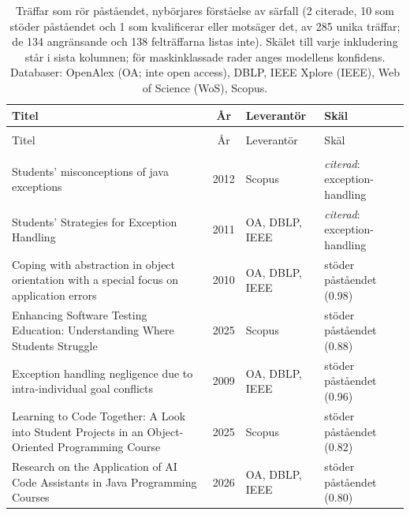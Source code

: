 
\begingroup\footnotesize
\begin{longtable}{@{}%
  >{\raggedright\arraybackslash}p{}c%
  >{\raggedright\arraybackslash}p{}%
  >{\raggedright\arraybackslash}p{}@{}}
\caption{Träffar som rör påståendet, nybörjares förståelse av särfall (2 citerade, 10 som stöder påståendet och 1 som kvalificerar eller motsäger det, av 285 unika träffar; de 134 angränsande och 138 felträffarna listas inte). Skälet till varje inkludering står i sista kolumnen; för maskinklassade rader anges modellens konfidens. Databaser: OpenAlex (OA; inte open access), DBLP, IEEE Xplore (IEEE), Web of Science (WoS), Scopus.}\label{tab:sok-nyborjare}\\
\toprule
Titel & År & Leverantör & Skäl \\
\midrule
\endfirsthead
\multicolumn{4}{@{}l}{\emph{\tablename~\thetable{} (forts.)}}\\
\toprule
Titel & År & Leverantör & Skäl \\
\midrule
\endhead
\midrule \multicolumn{4}{r@{}}{\emph{forts.\ på nästa sida}}\\
\endfoot
\bottomrule
\endlastfoot
Students' misconceptions of java exceptions & 2012 & Scopus & \emph{citerad}: exception-handling \\
Students' Strategies for Exception Handling & 2011 & OA, DBLP, IEEE & \emph{citerad}: exception-handling \\
Coping with abstraction in object orientation with a special focus on application errors & 2010 & OA, DBLP, IEEE & stöder påståendet (0.98) \\
Enhancing Software Testing Education: Understanding Where Students Struggle & 2025 & Scopus & stöder påståendet (0.88) \\
Exception handling negligence due to intra-individual goal conflicts & 2009 & OA, DBLP, IEEE & stöder påståendet (0.96) \\
Learning to Code Together: A Look into Student Projects in an Object-Oriented Programming Course & 2025 & Scopus & stöder påståendet (0.82) \\
Research on the Application of AI Code Assistants in Java Programming Courses & 2026 & OA, DBLP, IEEE & stöder påståendet (0.80) \\

\end{longtable}

